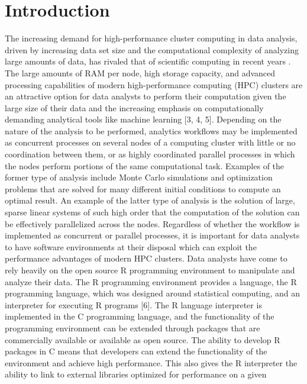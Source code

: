 \graphicspath{{plots/}}
\section{Introduction}

The increasing demand for high-performance cluster computing in data analysis, driven by
increasing data set size and the computational complexity of analyzing large amounts of
data, has rivaled that of scientific computing in recent years \cite{fox:bdBenchmarking,
kouzes:paradigm}.  The large amounts of RAM per node, high storage capacity, and advanced
processing capabilities of modern high-performance computing (HPC) clusters are an
attractive option for data analysts to perform their computation given the large size of
their data and the increasing emphasis on computationally demanding analytical tools like
machine learning [3, 4, 5].  Depending on the nature of the analysis to be performed,
analytics workflows may be implemented as concurrent processes on several nodes of a
computing cluster with little or no coordination between them, or as highly coordinated
parallel processes in which the nodes perform portions of the same computational task.
Examples of the former type of analysis include Monte Carlo simulations and optimization
problems that are solved for many different initial conditions to compute an optimal
result.  An example of the latter type of analysis is the solution of large, sparse linear
systems of such high order that the computation of the solution can be effectively
parallelized across the nodes. Regardless of whether the workflow is implemented as
concurrent or parallel processes, it is important for data analysts to have software
environments at their disposal which can exploit the performance advantages of modern HPC
clusters.  Data analysts have come to rely heavily on the open source R programming
environment to manipulate and analyze their data.  The R programming environment provides
a language, the R programming language, which was designed around statistical computing,
and an interpreter for executing R programs [6].  The R language interpreter is
implemented in the C programming language, and the functionality of the programming
environment can be extended through packages that are commercially available or available
as open source.  The ability to develop R packages in C means that developers can extend
the functionality of the environment and achieve high performance.  This also gives the R
interpreter the ability to link to external libraries optimized for performance on a given
